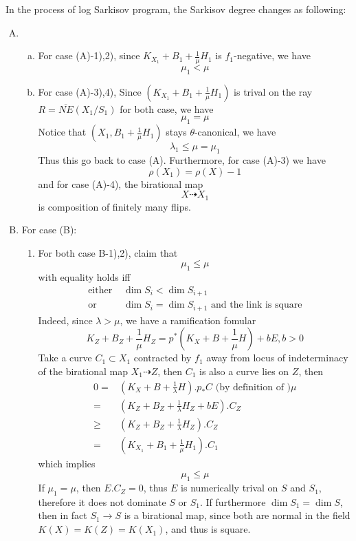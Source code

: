 \documentclass{article}
\begin{document}
In the process of log Sarkisov program, the Sarkisov degree changes as following:
\begin{enumerate}[(A)]
	\item 
	\begin{enumerate}[a)]
		\item For case (A)-1),2),  since $ K_{X_1}+B_1+\frac{1}{\mu}H_1 $ is $ f_1 $-negative, we have 
		$$ \mu_1<\mu $$
		\item For case (A)-3),4), Since $ (K_{X_1}+B_1+\frac{1}{\mu}H_1) $ is trival on the ray $ R=\overline{NE}(X_1/S_1) $ for both case, we have
		$$ \mu_1=\mu $$
		Notice that $ (X_1,B_1+\frac{1}{\mu}H_1) $ stays $ \theta $-canonical, we have
		$$ \lambda_1\leqslant \mu=\mu_1 $$
		Thus this go back to case (A). Furthermore,   for case (A)-3) we have
		$$ \rho(X_1)=\rho(X)-1 $$
		and for case (A)-4), the birational map
		$$ X\dashrightarrow X_1 $$
		is composition of finitely many flips.
	\end{enumerate}	
	\item For case (B): 
	\begin{enumerate}[1)]
		\item For both case B-1),2), claim that 
		$$ \mu_1\leqslant \mu $$
		with equality holds iff 
		\begin{equation*}
			\begin{aligned}
				\text{either } &\dim S_i<\dim S_{i+1} \\
				\text{or }&\dim S_i=\dim S_{i+1} \text{ and the link is square} 
			\end{aligned}
		\end{equation*} 
		Indeed, since $ \lambda>\mu $, we have a ramification fomular
		$$ K_Z+B_Z+\frac{1}{\mu}H_Z=p^*(K_X+B+\frac{1}{\mu}H)+bE, b>0 $$
		Take a curve $ C_1\subset X_1 $ contracted by $ f_1 $ away from locus of indeterminacy of the birational map $ X_1\dashrightarrow Z $, then $ C_1 $ is also a curve lies on $ Z $, then
		\begin{equation*}
			\begin{aligned}
				0=& (K_{X}+B+\frac{1}{\lambda}H).p_*C \text{ (by definition of )} \mu\\
				=&(K_{Z}+B_{Z}+\frac{1}{\lambda}H_Z+bE).C_{Z}\\
				\geqslant&(K_Z+B_Z+\frac{1}{\lambda}H_Z).C_Z\\
				=&(K_{X_1}+B_1+\frac{1}{\mu}H_1).C_1
			\end{aligned}
		\end{equation*} 
		which implies 
		$$ \mu_1\leqslant \mu $$
		If $ \mu_1=\mu $, then $ E.C_Z=0 $, thus $ E $ is numerically trival on $ S $ and $ S_1 $, therefore it  does not dominate $ S $ or $ S_1 $. If furthermore $ \dim S_1=\dim S $, then in fact $  S_1\to S  $ is a birational map, since both are normal in the field $ K(X)=K(Z)=K(X_1) $, and thus is square.

\end{enumerate}
\end{enumerate}
\end{document}
